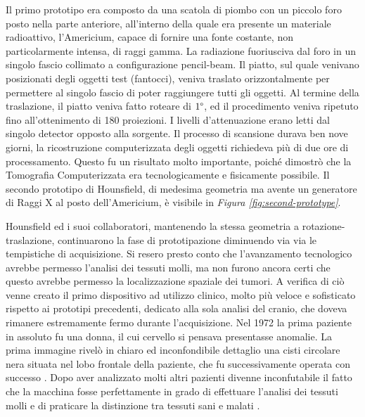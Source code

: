 \documentclass[a4paper,12pt, doubleside]{report}
\begin{document}
                    Il primo prototipo era composto da una scatola di piombo con un piccolo foro posto nella parte anteriore, all’interno della quale era presente un materiale radioattivo, l’Americium, capace di fornire una fonte costante, non particolarmente intensa, di raggi gamma. La radiazione fuoriusciva dal foro in un singolo fascio collimato a configurazione pencil-beam. Il piatto, sul quale venivano posizionati degli oggetti test (fantocci), veniva traslato orizzontalmente per permettere al singolo fascio di poter raggiungere tutti gli oggetti. Al termine della traslazione, il piatto veniva fatto roteare di $1\degree$, ed il procedimento veniva ripetuto fino all'ottenimento di 180 proiezioni. I livelli d'attenuazione erano letti dal singolo detector opposto alla sorgente. Il processo di scansione durava ben nove giorni, la ricostruzione computerizzata degli oggetti richiedeva più di due ore di processamento. Questo fu un risultato molto importante, poiché dimostrò che la Tomografia Computerizzata era tecnologicamente e fisicamente possibile. Il secondo prototipo di Hounsfield, di medesima geometria ma avente un generatore di Raggi X al posto dell'Americium, è visibile in \textit{Figura \ref{fig:second-prototype}}.
                
                \bigskip
                \par
                    Hounsfield ed i suoi collaboratori, mantenendo la stessa geometria a rotazione-traslazione, continuarono la fase di prototipazione diminuendo via via le tempistiche di acquisizione. Si resero presto conto che l'avanzamento tecnologico avrebbe permesso l'analisi dei tessuti molli, ma non furono ancora certi che questo avrebbe permesso la localizzazione spaziale dei tumori. A verifica di ciò venne creato il primo dispositivo ad utilizzo clinico, molto più veloce e sofisticato rispetto ai prototipi precedenti, dedicato alla sola analisi del cranio, che doveva rimanere estremamente fermo durante l'acquisizione. Nel 1972 la prima paziente in assoluto fu una donna, il cui cervello si pensava presentasse anomalie. La prima immagine rivelò in chiaro ed inconfondibile dettaglio una cisti circolare nera situata nel lobo frontale della paziente, che fu successivamente operata con successo \cite{scanner-story}. Dopo aver analizzato molti altri pazienti divenne inconfutabile il fatto che la macchina fosse perfettamente in grado di effettuare l'analisi dei tessuti molli e di praticare la distinzione tra tessuti sani e malati \cite{hounsfield-nobel-lecture}.
                    
\end{document}
